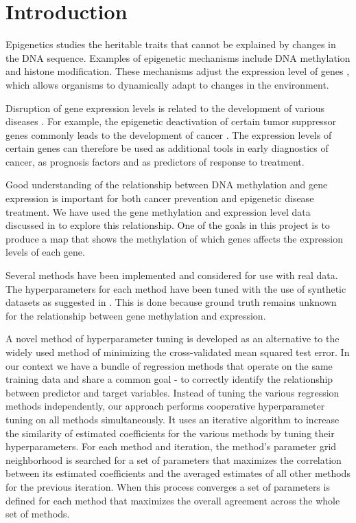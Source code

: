 \chapter{Introduction}
\setcounter{page}{1}
Epigenetics \cite{holliday2006epigenetics} studies the heritable traits that cannot be explained by changes in the DNA sequence. Examples of epigenetic mechanisms include DNA methylation and histone modification. These mechanisms adjust the expression level of genes \cite{jaenisch2003epigenetic}, which allows organisms to dynamically adapt to changes in the environment.

Disruption of gene expression levels is related to the development of various diseases \cite{egger2004epigenetics}. For example, the epigenetic deactivation of certain tumor suppressor genes commonly leads to the development of cancer \cite{esteller2008epigenetics}. The expression levels of certain genes can therefore be used as additional tools in early diagnostics of cancer, as prognosis factors and as predictors of response to treatment.

Good understanding of the relationship between DNA methylation and gene expression is important for both cancer prevention and epigenetic disease treatment. We have used the gene methylation and expression level data discussed in \cite{cancer2012comprehensive} to explore this relationship. One of the goals in this project is to produce a map that shows the methylation of which genes affects the expression levels of each gene.

Several methods \cite{tibshirani1996regression,zou2005regularization,li2008network,li2010variable,pan2010incorporating,luo2012two,kim2013network} have been implemented and considered for use with real data. The hyperparameters for each method have been tuned with the use of synthetic datasets as suggested in \cite{li2008network}. This is done because ground truth remains unknown for the relationship between gene methylation and expression.

A novel method of hyperparameter tuning is developed as an alternative to the widely used method of minimizing the cross-validated mean squared test error. In our context we have a bundle of regression methods that operate on the same training data and share a common goal - to correctly identify the relationship between predictor and target variables. Instead of tuning the various regression methods independently, our approach performs cooperative hyperparameter tuning on all methods simultaneously. It uses an iterative algorithm to increase the similarity of estimated coefficients for the various methods by tuning their hyperparameters. For each method and iteration, the method's parameter grid neighborhood is searched for a set of parameters that maximizes the correlation between its estimated coefficients and the averaged estimates of all other methods for the previous iteration. When this process converges a set of parameters is defined for each method that maximizes the overall agreement across the whole set of methods.

